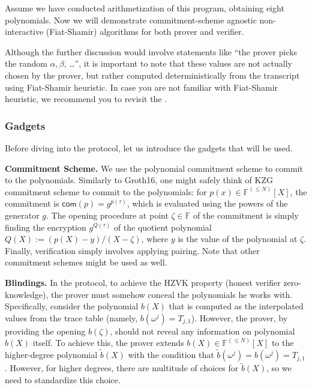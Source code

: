 \documentclass[../lecture-notes.tex]{subfiles}
\begin{document}
Assume we have conducted arithmetization of this program, obtaining eight
polynomials. Now we will demonstrate commitment-scheme agnostic non-interactive
(Fiat-Shamir) algorithms for both prover and verifier.

\begin{remark}
    Although the further discussion would involve statements like ``the prover
    picks the random $\alpha,\beta$, \ldots'', it is important to note that
    these values are not actually chosen by the prover, but rather computed
    deterministically from the transcript using Fiat-Shamir heuristic. In case 
    you are not familiar with Fiat-Shamir heuristic, we recommend you to revisit
    the .
\end{remark}

\subsubsection{Gadgets}

Before diving into the protocol, let us introduce the gadgets that will be used.

\textcolor{blue!60!black}{\textbf{Commitment Scheme.}} We use the polynomial
commitment scheme to commit to the polynomials. Similarly to Groth16, one might
safely think of KZG commitment scheme to commit to the polynomials: for $p(x)
\in \mathbb{F}^{(\leq N)}[X]$, the commitment is $\mathsf{com}(p) =
g^{p(\tau)}$, which is evaluated using the powers of the generator $g$. The
opening procedure at point $\zeta \in \mathbb{F}$ of the commitment is simply
finding the encryption $g^{Q(\tau)}$ of the quotient polynomial $Q(X) :=
(p(X)-y)/(X-\zeta)$, where $y$ is the value of the polynomial at $\zeta$.
Finally, verification simply involves applying pairing. Note that other
commitment schemes might be used as well.

\textcolor{blue!60!black}{\textbf{Blindings.}} In the protocol, to achieve 
the HZVK property (honest verifier zero-knowledge), the prover must somehow 
conceal the polynomials he works with. Specifically, consider the polynomial 
$b(X)$ that is computed as the interpolated values from the trace table (namely, 
$b(\omega^j) = T_{j,1}$). However, the prover, by providing the opening $b(\zeta)$,
should not reveal any information on polynomial $b(X)$ itself. To achieve this, the prover
extends $b(X) \in \mathbb{F}^{(\leq N)}[X]$ to the higher-degree polynomial $\widetilde{b}(X)$
with the condition that $\widetilde{b}(\omega^j) = b(\omega^j) = T_{j,1}$. However, for higher 
degrees, there are multitude of choices for $\widetilde{b}(X)$, so we need to standardize 
this choice. 
\end{document}
